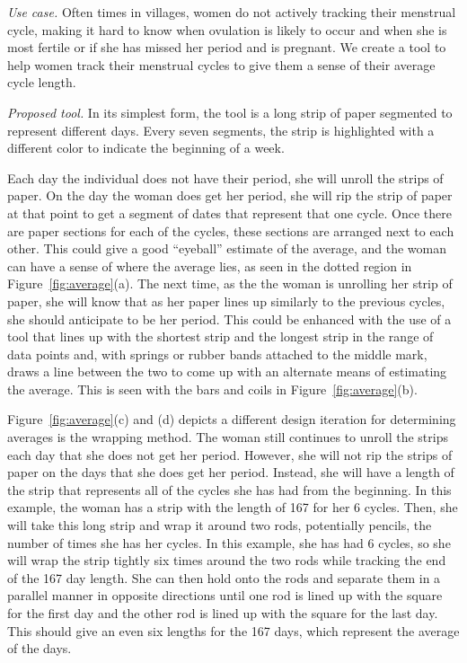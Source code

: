 \documentclass{sig-alternate}
\begin{document}
\emph{Use case.} 
Often times in villages, women do not actively tracking their menstrual cycle, making it hard to know when ovulation is likely to occur and when she is most fertile or if she has missed her period and is pregnant. We create a tool to help women track their menstrual cycles to give them a sense of their average cycle length.

\emph{Proposed tool.}
In its simplest form, the tool is a long strip of paper segmented to represent different days. Every seven segments, the strip is highlighted with a different color to indicate the beginning of a week.

Each day the individual does not have their period, she will unroll the strips of paper. 
On the day the woman does get her period, she will rip the strip of paper at that point to get a segment of dates that represent that one cycle. Once there are paper sections for each of the cycles, these sections are arranged next to each other. This could give a good ``eyeball'' estimate of the average, and the woman can have a sense of where the average lies, as seen in the dotted region in Figure~\ref{fig:average}(a). The next time, as the the woman is unrolling her strip of paper, she will know that as her paper lines up similarly to the previous cycles, she should anticipate to be her period. This could be enhanced with the use of a tool that lines up with the shortest strip and the longest strip in the range of data points and, with springs or rubber bands attached to the middle mark, draws a line between the two to come up with an alternate means of estimating the average. This is seen with the bars and coils in Figure~\ref{fig:average}(b).

Figure~\ref{fig:average}(c) and (d) depicts a different design iteration for determining averages is the wrapping method. The woman still continues to unroll the strips each day that she does not get her period. However, she will not rip the strips of paper on the days that she does get her period. Instead, she will have a length of the strip that represents all of the cycles she has had from the beginning. In this example, the woman has a strip with the length of 167 for her 6 cycles. Then, she will take this long strip and wrap it around two rods, potentially pencils, the number of times she has her cycles. In this example, she has had 6 cycles, so she will wrap the strip tightly six times around the two rods while tracking the end of the 167 day length. She can then hold onto the rods and separate them in a parallel manner in opposite directions until one rod is lined up with the square for the first day and the other rod is lined up with the square for the last day. This should give an even six lengths for the 167 days, which represent the average of the days.
\end{document}
